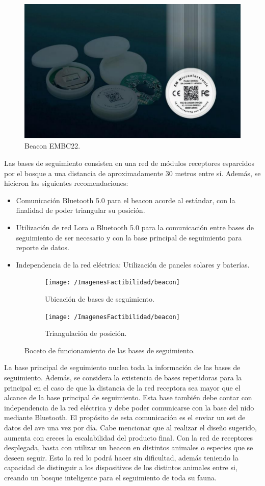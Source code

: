 \begin{figure}[H]
	\centering
	\includegraphics[width=0.7\linewidth]{ImagenesFactibilidad/beaconpic}
	\caption{Beacon EMBC22.}
	\label{fig:beacon}
\end{figure}
Las bases de seguimiento consisten en una red de módulos receptores esparcidos por el bosque a una distancia de aproximadamente 30 metros entre sí.
Además, se hicieron las siguientes recomendaciones:
\begin{itemize}
\item Comunicación Bluetooth 5.0 para el beacon acorde al estándar, con la finalidad de poder triangular su posición.
\item Utilización de red Lora o Bluetooth 5.0 para la comunicación entre bases de seguimiento de ser necesario y con la base principal de seguimiento para reporte de datos.
\item Independencia de la red eléctrica: Utilización de paneles solares y baterías.
\end{itemize}
\begin{figure}[H]
\begin{subfigure}{.5\textwidth}
  \centering
  \texttt{[image: /ImagenesFactibilidad/beacon]}
  \caption{Ubicación de bases de seguimiento.}
  \label{fig:sfig1}
\end{subfigure}%
\begin{subfigure}{.5\textwidth}
  \centering
  \texttt{[image: /ImagenesFactibilidad/beacon]}
  \caption{Triangulación de posición.}
  \label{fig:sfig2}
\end{subfigure}%
\caption{Boceto de funcionamiento de las bases de seguimiento.}
\label{fig:fig}
\end{figure}
La base principal de seguimiento nuclea toda la información de las bases de seguimiento. Además, se considera la existencia de bases repetidoras para la principal en el caso de que la distancia de la red receptora sea mayor que el alcance de la base principal de seguimiento.
Esta base también debe contar con independencia de la red eléctrica y debe poder comunicarse con la base del nido mediante Bluetooth. El propósito de esta comunicación es el enviar un set de datos del ave una vez por día.
Cabe mencionar que al realizar el diseño sugerido, aumenta con creces la escalabilidad del producto final. Con la red de receptores desplegada, basta con utilizar un beacon en distintos animales o especies que se deseen seguir. Esto la red lo podrá hacer sin dificultad, además teniendo la capacidad de distinguir a los dispositivos de los distintos animales entre si, creando un bosque inteligente para el seguimiento de toda su fauna.
